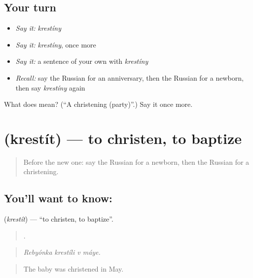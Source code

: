 \subsection*{Your turn}
\begin{itemize}
\raggedright
  \item \emph{Say it:} \emph{krestíny}
  \item \emph{Say it:} \emph{krestíny}, once more
  \item \emph{Say it:} a sentence of your own with \emph{krestíny}
  \item \emph{Recall:} say the Russian for an anniversary, then the Russian for a newborn, then say \emph{krestíny} again
\end{itemize}

\begin{tcolorbox}[breakable,colback=teal!4,colframe=teal!35!black,title={Before you move on}]
What does  mean? (\textquotedblleft{}A christening (party)\textquotedblright{}.) Say it once more.
\end{tcolorbox}
\section[\texorpdfstring{\ru{крестить} (krestít)}{крестить (krestít)}]{ (krestít) — to christen, to baptize}

\label{lesson:RU-C310-krestit}



\begin{quote}
Before the new one: say the Russian for a newborn, then the Russian for a christening.
\end{quote}

\subsection*{You'll want to know: }
\textbf{} (\emph{krestít}) — \textquotedblleft{}to christen, to baptize\textquotedblright{}.

\begin{quote}
   .
\end{quote}

\begin{quote}
\emph{Rebyónka krestíli v máye.}
\end{quote}

\begin{quote}
The baby was christened in May.
\end{quote}

